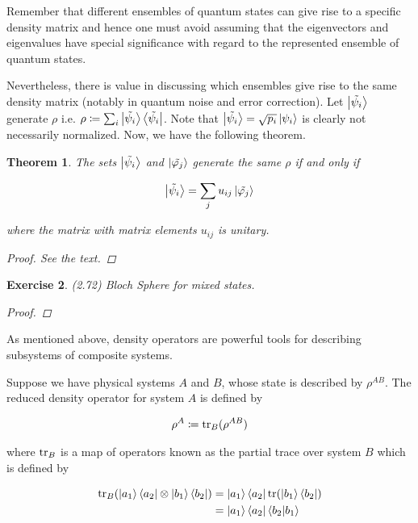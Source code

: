 \documentclass[11pt]{article}
\newcommand\0{\mathbf{0}}
\newcommand\<{\langle}
\renewcommand\>{\rangle}
\renewcommand\phi{\varphi}
\newtheorem{theorem}{Theorem}[section]
\newtheorem{exercise}[theorem]{Exercise}
\begin{document}
Remember that different ensembles of quantum states can give rise to a specific density matrix and hence one must avoid assuming that the eigenvectors and eigenvalues have special significance with regard to the represented ensemble of quantum states.

Nevertheless, there is value in discussing which ensembles give rise to the same density matrix (notably in quantum noise and error correction). Let $\ket{\tilde{\psi_i}}$ generate $\rho$ i.e. $\rho\coloneqq\sum_i\ket{\tilde{\psi_i}}\bra{\tilde{\psi_i}}$. Note that $\ket{\tilde{\psi_i}} = \sqrt{p_i}\ket{\psi_i}$ is clearly not necessarily normalized. Now, we have the following theorem.

\begin{theorem}
The sets $\ket{\tilde{\psi_i}}$ and $\ket{\tilde{\phi_j}}$ generate the same $\rho$ if and only if

\begin{align*}
	\ket{\tilde{\psi_i}} = \sum_j u_{ij}\ket{\tilde{\phi_j}}
\end{align*}

where the matrix with matrix elements $u_{ij}$ is unitary.
\begin{proof}
	See the text.
\end{proof}
\end{theorem}

\begin{exercise}
(2.72) Bloch Sphere for mixed states.
\begin{proof}
\end{proof}	
\end{exercise}

As mentioned above, density operators are powerful tools for describing subsystems of composite systems. 
 
Suppose we have physical systems $A$ and $B$, whose state is described by $\rho^{AB}$. The reduced density operator for system $A$ is defined by

\begin{align*}
\rho^A \coloneqq \tr_B(\rho^{AB})
\end{align*}

where $\tr_B$ is a map of operators known as the partial trace over system $B$ which is defined by

\begin{align*}
\tr_B(\ket{a_1}\bra{a_2} \otimes \ket{b_1}\bra{b_2}) &= \ket{a_1}\bra{a_2} \tr( \ket{b_1}\bra{b_2}) \\
&= \ket{a_1}\bra{a_2} \bra{b_2}\ket{b_1}
\end{align*}
\end{document}
